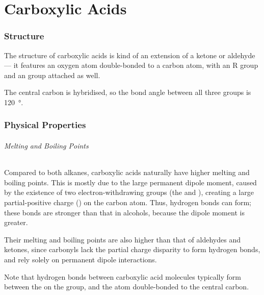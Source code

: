 

\pagebreak
\hypertarget{ChapterCarboxylicAcids}{}
\part{Carboxylic Acids}

	\section{Structure}

		The structure of carboxylic acids is kind of an extension of a ketone or aldehyde --- it features an oxygen atom double-bonded
		to a carbon atom, with an R group and an  group attached as well.


		The central carbon is \sptwo hybridised, so the bond angle between all three groups is \SI{120}{\degree}.


	\section{Physical Properties}

		\paragraph{Melting and Boiling Points}

		Compared to both alkanes, carboxylic acids naturally have higher melting and boiling points. This is mostly due to the large permanent
		dipole moment, caused by the existence of two electron-withdrawing groups (the  and ), creating a large partial-positive
		charge (\deltap) on the carbon atom. Thus, hydrogen bonds can form; these bonds are stronger than that in alcohols, because the dipole
		moment is greater.

		Their melting and boiling points are also higher than that of aldehydes and ketones, since carbonyls lack the  partial charge
		disparity to form hydrogen bonds, and rely solely on permanent dipole interactions.

		Note that hydrogen bonds between carboxylic acid molecules typically form between the  on the  group, and the  atom
		double-bonded to the central carbon.


